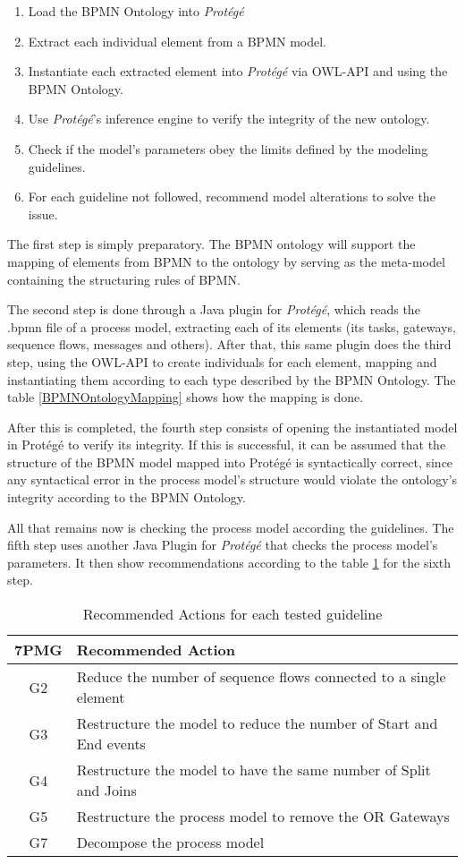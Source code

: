 \documentclass[a4paper,twoside]{article}
\begin{document}
\begin{enumerate}
	\item Load the BPMN Ontology into \textit{Protégé}
	\item Extract each individual element from a BPMN model.
	\item Instantiate each extracted element into \textit{Protégé} via OWL-API and using the BPMN Ontology.
	\item Use \textit{Protégé}'s inference engine to verify the integrity of the new ontology.
	\item Check if the model's parameters obey the limits defined by the modeling guidelines.
	\item For each guideline not followed, recommend model alterations to solve the issue.
\end{enumerate}

The first step is simply preparatory. The BPMN ontology will support the mapping of elements from BPMN to the ontology by serving as the meta-model containing the structuring rules of BPMN.

The second step is done through a Java plugin for \textit{Protégé}, which reads the .bpmn file of a process model, extracting each of its elements (its tasks, gateways, sequence flows, messages and others). After that, this same plugin does the third step, using the OWL-API to create individuals for each element, mapping and instantiating them according to each type described by the BPMN Ontology. The table \ref{BPMNOntologyMapping} shows how the mapping is done.


After this is completed, the fourth step consists of opening the instantiated model in Protégé to verify its integrity. If this is successful, it can be assumed that the structure of the BPMN model mapped into Protégé is syntactically correct, since any syntactical error in the process model's structure would violate the ontology's integrity according to the BPMN Ontology.

All that remains now is checking the process model according the guidelines. The fifth step uses another Java Plugin for \textit{Protégé} that checks the process model's parameters. It then show recommendations according to the table \ref{RecommendedActions} for the sixth step.

\begin{table}[]
	\centering
	\caption{Recommended Actions for each tested guideline}
	\label{RecommendedActions}
	\begin{tabular}{|c|p{5.5cm}|}
		\hline
		7PMG & Recommended Action \\ \hline
		G2 & Reduce the number of sequence flows connected to a single element \\ \hline
		G3 & Restructure the model to reduce the number of Start and End events \\ \hline
		G4 & Restructure the model to have the same number of Split and Joins \\ \hline
		G5 & Restructure the process model to remove the OR Gateways \\ \hline
		G7 & Decompose the process model \\ \hline
	\end{tabular}
\end{table}
\end{document}
